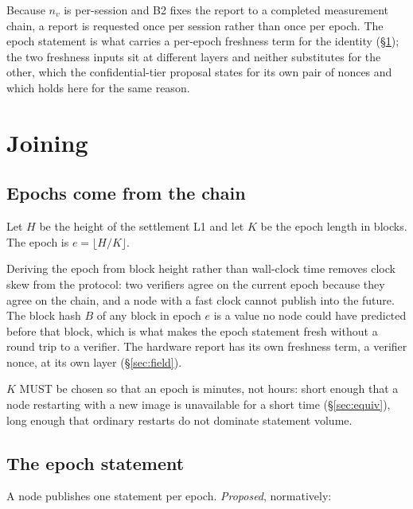 \documentclass[11pt,a4paper]{article}
\begin{document}
Because $n_v$ is per-session and B2 fixes the report to a completed measurement
chain, a report is requested once per session rather than once per epoch. The
epoch statement is what carries a per-epoch freshness term for the identity
(\S\ref{sec:join}); the two freshness inputs sit at different layers and neither
substitutes for the other, which the confidential-tier proposal states for its own
pair of nonces and which holds here for the same reason.

\section{Joining}
\label{sec:join}

\subsection{Epochs come from the chain}

Let $H$ be the height of the settlement L1 and let $K$ be the epoch length in
blocks. The epoch is $e = \lfloor H / K \rfloor$.

Deriving the epoch from block height rather than wall-clock time removes clock
skew from the protocol: two verifiers agree on the current epoch because they
agree on the chain, and a node with a fast clock cannot publish into the future.
The block hash $B$ of any block in epoch $e$ is a value no node could have
predicted before that block, which is what makes the epoch statement fresh without
a round trip to a verifier. The hardware report has its own freshness term, a
verifier nonce, at its own layer (\S\ref{sec:field}).

$K$ MUST be chosen so that an epoch is minutes, not hours: short enough that a
node restarting with a new image is unavailable for a short time
(\S\ref{sec:equiv}), long enough that ordinary restarts do not dominate statement
volume.

\subsection{The epoch statement}
\label{sec:stmt}

A node publishes one statement per epoch. \emph{Proposed}, normatively:
\end{document}
